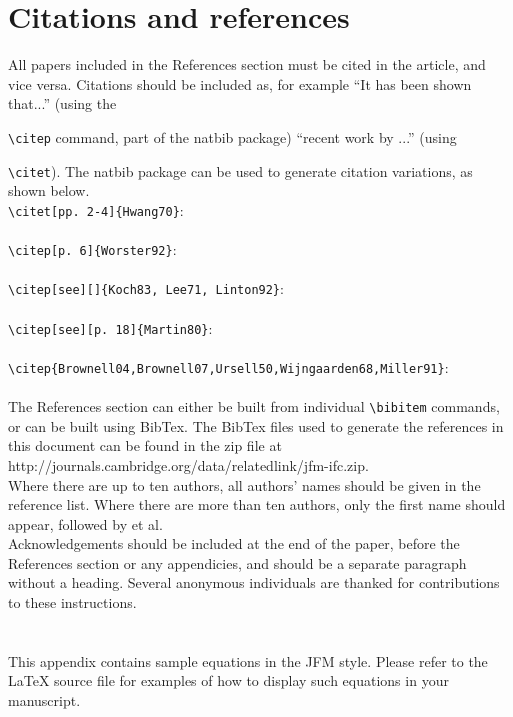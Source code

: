 \documentclass{jfm}
\begin{document}
\section{Citations and references}
All papers included in the References section must be cited in the article, and vice versa. Citations should be included as, for example ``It has been shown \citep{Rogallo81} that...'' (using the {\verb}\citep} command, part of the natbib package) ``recent work by \citet{Dennis85}...'' (using {\verb}\citet}).
The natbib package can be used to generate citation variations, as shown below.\\
\verb#\citet[pp. 2-4]{Hwang70}#:\\
\citet[pp. 2-4]{Hwang70} \\
\verb#\citep[p. 6]{Worster92}#:\\
\citep[p. 6]{Worster92}\\
\verb#\citep[see][]{Koch83, Lee71, Linton92}#:\\
\citep[see][]{Koch83, Lee71, Linton92}\\
\verb#\citep[see][p. 18]{Martin80}#:\\
\citep[see][p. 18]{Martin80}\\
\verb#\citep{Brownell04,Brownell07,Ursell50,Wijngaarden68,Miller91}#:\\
\citep{Brownell04,Brownell07,Ursell50,Wijngaarden68,Miller91}\\
The References section can either be built from individual \verb#\bibitem# commands, or can be built using BibTex. The BibTex files used to generate the references in this document can be found in the zip file at http://journals.cambridge.org/\linebreak[3]data/\linebreak[3]relatedlink/\linebreak[3]jfm-ifc.zip.\\
Where there are up to ten authors, all authors' names should be given in the reference list. Where there are more than ten authors, only the first name should appear, followed by et al.\\

Acknowledgements should be included at the end of the paper, before the References section or any appendicies, and should be a separate paragraph without a heading. Several anonymous individuals are thanked for contributions to these instructions.

\appendix
\section{}\label{appA}
This appendix contains sample equations in the JFM style. Please refer to the {\LaTeX} source file for examples of how to display such equations in your manuscript.

}}
\end{document}
